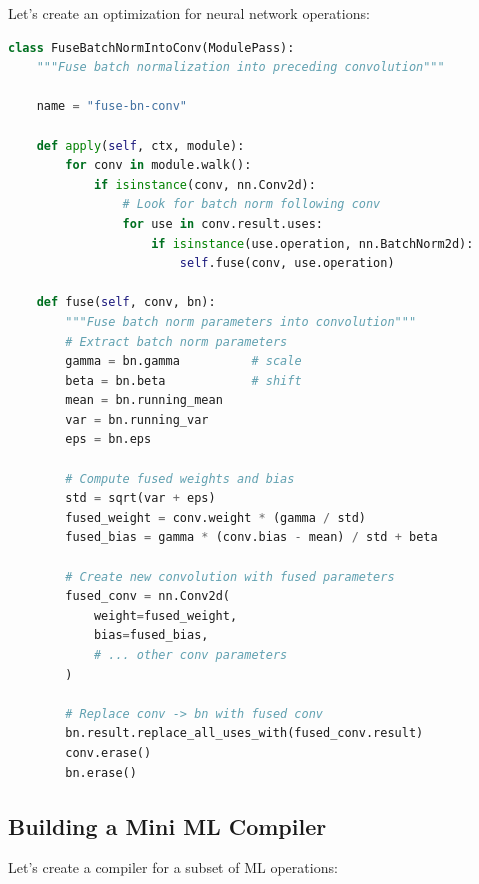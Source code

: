 \documentclass[11pt,a4paper]{article}
\begin{document}
Let's create an optimization for neural network operations:

\begin{lstlisting}[language=Python, caption=Neural Network Optimization]
class FuseBatchNormIntoConv(ModulePass):
    """Fuse batch normalization into preceding convolution"""

    name = "fuse-bn-conv"

    def apply(self, ctx, module):
        for conv in module.walk():
            if isinstance(conv, nn.Conv2d):
                # Look for batch norm following conv
                for use in conv.result.uses:
                    if isinstance(use.operation, nn.BatchNorm2d):
                        self.fuse(conv, use.operation)

    def fuse(self, conv, bn):
        """Fuse batch norm parameters into convolution"""
        # Extract batch norm parameters
        gamma = bn.gamma          # scale
        beta = bn.beta            # shift
        mean = bn.running_mean
        var = bn.running_var
        eps = bn.eps

        # Compute fused weights and bias
        std = sqrt(var + eps)
        fused_weight = conv.weight * (gamma / std)
        fused_bias = gamma * (conv.bias - mean) / std + beta

        # Create new convolution with fused parameters
        fused_conv = nn.Conv2d(
            weight=fused_weight,
            bias=fused_bias,
            # ... other conv parameters
        )

        # Replace conv -> bn with fused conv
        bn.result.replace_all_uses_with(fused_conv.result)
        conv.erase()
        bn.erase()
\end{lstlisting}

\subsection{Building a Mini ML Compiler}

Let's create a compiler for a subset of ML operations:
\end{document}
